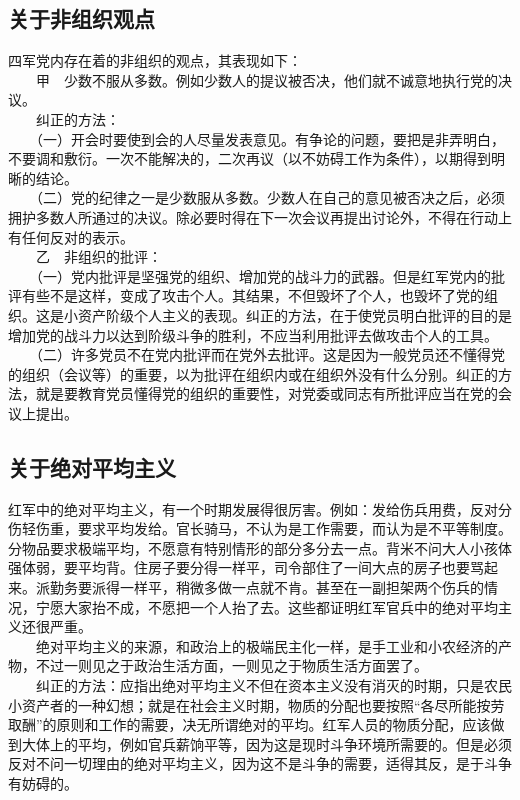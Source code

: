 \documentclass[cn,11pt,chinese]{elegantbook}
\def\myformat#1{\hfil\hfil #1}
\begin{document}
\subsection*{\myformat{关于非组织观点}}
四军党内存在着的非组织的观点，其表现如下：\\
　　甲　少数不服从多数。例如少数人的提议被否决，他们就不诚意地执行党的决议。\\
　　纠正的方法：\\
　　（一）开会时要使到会的人尽量发表意见。有争论的问题，要把是非弄明白，不要调和敷衍。一次不能解决的，二次再议（以不妨碍工作为条件），以期得到明晰的结论。\\
　　（二）党的纪律之一是少数服从多数。少数人在自己的意见被否决之后，必须拥护多数人所通过的决议。除必要时得在下一次会议再提出讨论外，不得在行动上有任何反对的表示。\\
　　乙　非组织的批评：\\
　　（一）党内批评是坚强党的组织、增加党的战斗力的武器。但是红军党内的批评有些不是这样，变成了攻击个人。其结果，不但毁坏了个人，也毁坏了党的组织。这是小资产阶级个人主义的表现。纠正的方法，在于使党员明白批评的目的是增加党的战斗力以达到阶级斗争的胜利，不应当利用批评去做攻击个人的工具。\\
　　（二）许多党员不在党内批评而在党外去批评。这是因为一般党员还不懂得党的组织（会议等）的重要，以为批评在组织内或在组织外没有什么分别。纠正的方法，就是要教育党员懂得党的组织的重要性，对党委或同志有所批评应当在党的会议上提出。\\
\subsection*{\myformat{关于绝对平均主义}}
红军中的绝对平均主义，有一个时期发展得很厉害。例如：发给伤兵用费，反对分伤轻伤重，要求平均发给。官长骑马，不认为是工作需要，而认为是不平等制度。分物品要求极端平均，不愿意有特别情形的部分多分去一点。背米不问大人小孩体强体弱，要平均背。住房子要分得一样平，司令部住了一间大点的房子也要骂起来。派勤务要派得一样平，稍微多做一点就不肯。甚至在一副担架两个伤兵的情况，宁愿大家抬不成，不愿把一个人抬了去。这些都证明红军官兵中的绝对平均主义还很严重。\\
　　绝对平均主义的来源，和政治上的极端民主化一样，是手工业和小农经济的产物，不过一则见之于政治生活方面，一则见之于物质生活方面罢了。\\
　　纠正的方法：应指出绝对平均主义不但在资本主义没有消灭的时期，只是农民小资产者的一种幻想；就是在社会主义时期，物质的分配也要按照“各尽所能按劳取酬”的原则和工作的需要，决无所谓绝对的平均。红军人员的物质分配，应该做到大体上的平均，例如官兵薪饷平等，因为这是现时斗争环境所需要的。但是必须反对不问一切理由的绝对平均主义，因为这不是斗争的需要，适得其反，是于斗争有妨碍的。\\
\end{document}
